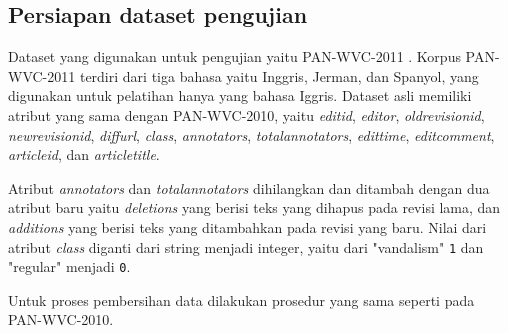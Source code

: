 \subsection{Persiapan dataset pengujian}

Dataset yang digunakan untuk pengujian yaitu PAN-WVC-2011
\cite{potthast:2010b}.
Korpus PAN-WVC-2011 terdiri dari tiga bahasa yaitu Inggris, Jerman, dan
Spanyol, yang digunakan untuk pelatihan hanya yang bahasa Iggris.
Dataset asli memiliki atribut yang sama dengan PAN-WVC-2010, yaitu
\textit{editid},
\textit{editor},
\textit{oldrevisionid},
\textit{newrevisionid},
\textit{diffurl},
\textit{class},
\textit{annotators},
\textit{totalannotators},
\textit{edittime},
\textit{editcomment},
\textit{articleid}, dan
\textit{articletitle}.

Atribut \textit{annotators} dan \textit{totalannotators} dihilangkan dan
ditambah dengan dua atribut baru yaitu \textit{deletions} yang berisi teks yang
dihapus pada revisi lama, dan \textit{additions} yang berisi teks yang
ditambahkan pada revisi yang baru.
Nilai dari atribut \textit{class} diganti dari string menjadi integer, yaitu
dari "vandalism" \texttt{1}
dan "regular" menjadi \texttt{0}.

Untuk proses pembersihan data dilakukan prosedur yang sama seperti pada
PAN-WVC-2010.
